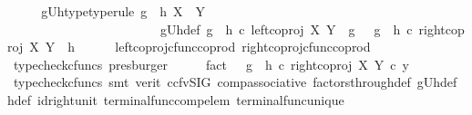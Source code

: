 \begin{isabellebody}
\ \ \isamarkupfalse%
\ \isamarkupfalse%
\ gUh{\isacharunderscore}{\kern0pt}type{\isacharbrackleft}{\kern0pt}type{\isacharunderscore}{\kern0pt}rule{\isacharbrackright}{\kern0pt}{\isacharcolon}{\kern0pt}\ {\isachardoublequoteopen}g\ {\isasymamalg}\ h{\isacharcolon}{\kern0pt}\ X\ {\isasymCoprod}\ Y\ {\isasymrightarrow}\ {\isasymOmega}{\isachardoublequoteclose}\ \ \isanewline
\ \ \ \ \ \ \ \ \ \ \ \ \ \ \ \ \ \ \ \ \ \ \ \ gUh{\isacharunderscore}{\kern0pt}def{\isacharcolon}{\kern0pt}\ {\isachardoublequoteopen}{\isacharparenleft}{\kern0pt}g\ {\isasymamalg}\ h{\isacharparenright}{\kern0pt}\ {\isasymcirc}\isactrlsub c\ {\isacharparenleft}{\kern0pt}left{\isacharunderscore}{\kern0pt}coproj\ X\ Y{\isacharparenright}{\kern0pt}\ {\isacharequal}{\kern0pt}\ g\ {\isasymand}\ \ {\isacharparenleft}{\kern0pt}g\ {\isasymamalg}\ h{\isacharparenright}{\kern0pt}\ {\isasymcirc}\isactrlsub c\ {\isacharparenleft}{\kern0pt}right{\isacharunderscore}{\kern0pt}coproj\ X\ Y{\isacharparenright}{\kern0pt}\ {\isacharequal}{\kern0pt}\ h{\isachardoublequoteclose}\isanewline
\ \ \ \ \isamarkupfalse%
\ left{\isacharunderscore}{\kern0pt}coproj{\isacharunderscore}{\kern0pt}cfunc{\isacharunderscore}{\kern0pt}coprod\ right{\isacharunderscore}{\kern0pt}coproj{\isacharunderscore}{\kern0pt}cfunc{\isacharunderscore}{\kern0pt}coprod\ \isamarkupfalse%
\ {\isacharparenleft}{\kern0pt}typecheck{\isacharunderscore}{\kern0pt}cfuncs{\isacharcomma}{\kern0pt}\ presburger{\isacharparenright}{\kern0pt}\isanewline
\ \ \isamarkupfalse%
\ \isamarkupfalse%
\ fact{}{\isacharcolon}{\kern0pt}\ {\isachardoublequoteopen}{\isasymf}\ {\isacharequal}{\kern0pt}\ {\isacharparenleft}{\kern0pt}{\isacharparenleft}{\kern0pt}g\ {\isasymamalg}\ h{\isacharparenright}{\kern0pt}\ {\isasymcirc}\isactrlsub c\ {\isacharparenleft}{\kern0pt}right{\isacharunderscore}{\kern0pt}coproj\ X\ Y{\isacharparenright}{\kern0pt}{\isacharparenright}{\kern0pt}\ {\isasymcirc}\isactrlsub c\ y{\isachardoublequoteclose}\isanewline
\ \ \ \ \isamarkupfalse%
\ {\isacharparenleft}{\kern0pt}typecheck{\isacharunderscore}{\kern0pt}cfuncs{\isacharcomma}{\kern0pt}\ smt\ {\isacharparenleft}{\kern0pt}verit{\isacharcomma}{\kern0pt}\ ccfv{\isacharunderscore}{\kern0pt}SIG{\isacharparenright}{\kern0pt}\ comp{\isacharunderscore}{\kern0pt}associative{}\ factors{\isacharunderscore}{\kern0pt}through{\isacharunderscore}{\kern0pt}def{}\ gUh{\isacharunderscore}{\kern0pt}def\ h{\isacharunderscore}{\kern0pt}def\ id{\isacharunderscore}{\kern0pt}right{\isacharunderscore}{\kern0pt}unit{}\ terminal{\isacharunderscore}{\kern0pt}func{\isacharunderscore}{\kern0pt}comp{\isacharunderscore}{\kern0pt}elem\ terminal{\isacharunderscore}{\kern0pt}func{\isacharunderscore}{\kern0pt}unique{\isacharparenright}{\kern0pt}\isanewline

\end{isabellebody}
